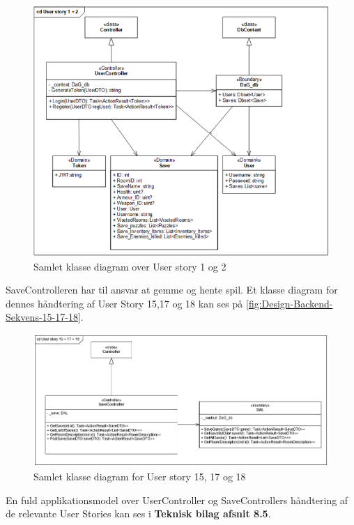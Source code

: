 \begin{figure}[H]
\centering
\includegraphics[width = \textwidth]{02-Body/Images/Backend_klasse_1_2.PNG}
\caption{Samlet klasse diagram over User story 1 og 2}
\label{fig:Design-Backend-Klasse-1-2}
\end{figure}

\noindent SaveControlleren har til ansvar at gemme og hente spil. Et klasse diagram for dennes håndtering af User Story 15,17 og 18 kan ses på \autoref{fig:Design-Backend-Sekvens-15-17-18}.\\


\begin{figure}[H]
\centering
\includegraphics[width = \textwidth]{02-Body/Images/Backend_klasse_15_17_18.PNG}
\caption{Samlet klasse diagram for User story 15, 17 og 18}
\label{fig:Design-Backend-Sekvens-15-17-18}
\end{figure}

\noindent En fuld applikationsmodel over UserController og SaveControllers håndtering af de relevante User Stories kan ses i \textbf{Teknisk bilag afsnit 8.5}.\\


